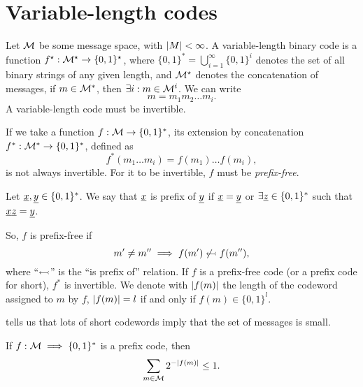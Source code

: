 \chapter{Variable-length codes}

Let $\mathcal{M}$ be some message space, with $\left|{M}\right| < \infty$.
A variable-length binary code is a function $f^{\star} : \mathcal{M}^{\star} \to \{0,1\}^{\star}$, where $\{0, 1\}^* = \bigcup_{i = 1}^\infty \{0, 1\}^i$ denotes the set of all binary strings of any given length, and $\mathcal{M}^{\star}$ denotes the concatenation of messages, \ie if $m \in \mathcal{M}^*$, then $\exists i : m \in \mathcal{M}^i$.
We can write
\begin{equation*}
	m = m_1 m_2 \dots m_i.
\end{equation*}
A variable-length code must be invertible.

If we take a function $f : \mathcal{M} \to \{0, 1\}^*$, its extension by concatenation $f^* : \mathcal{M}^* \to \{0, 1\}^*$, defined as
\begin{equation*}
	f^*(m_1 \dots m_i) = f(m_1) \dots f(m_i),
\end{equation*}
is not always invertible.
For it to be invertible, $f$ must be \emph{prefix-free}.

Let $\underline{x}, \underline{y} \in \{0, 1\}^*$.
We say that $\underline{x}$ is prefix of $\underline{y}$ if $\underline{x} = \underline{y}$ or $\exists \underline{z} \in \{0, 1\}^*$ such that $\underline{x}\underline{z} = \underline{y}$.

So, $f$ is prefix-free if
\begin{equation*}
	m' \neq m'' \implies f(m') \not\leftarrowtail f(m''),
\end{equation*}
where ``$\leftarrowtail$'' is the ``is prefix of'' relation.
If $f$ is a prefix-free code (or a prefix code for short), $f^*$ is invertible.
We denote with $\left|{f(m)}\right|$ the length of the codeword assigned to $m$ by $f$, \ie $\left|{f(m)}\right| = l$ if and only if $f(m) \in \{0, 1\}^l$.

 tells us that lots of short codewords imply that the set of messages is small.
\begin{prop}\label{prop:kraft}
	If $f : \mathcal{M} \implies \{0, 1\}^*$ is a prefix code, then
	\begin{equation*}
		\sum_{m \in \mathcal{M}} 2^{-\left|{f(m)}\right|} \le 1.
	\end{equation*}
\end{prop}

